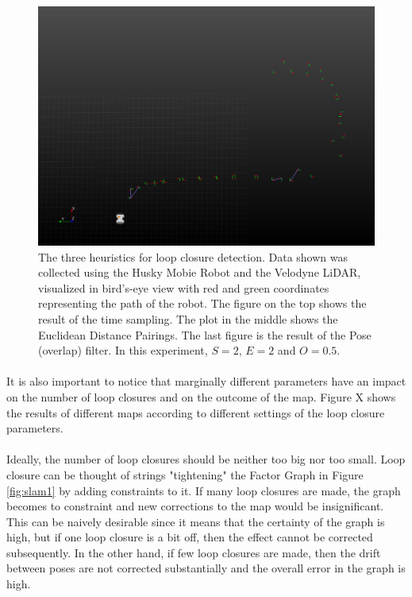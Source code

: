 \documentclass[11pt]{article}
\begin{document}
\begin{figure}
\begin{minipage}{0.67\textwidth}
				\includegraphics[width=\textwidth]{LoopClosureFinal}
	\end{minipage}\hfill
	\begin{minipage}{0.33\textwidth}
		\centering
		\caption[t]{The three heuristics for loop closure detection. Data shown was collected using the Husky Mobie Robot and the Velodyne LiDAR, visualized in bird's-eye view with red and green coordinates representing the path of the robot. The figure on the top shows the result of the time sampling. The plot in the middle shows the Euclidean Distance Pairings. The last figure is the result of the Pose (overlap) filter. In this experiment, $S=2$, $E=2$ and $O=0.5$.}
		\label{fig:loopClosureDetection}
	\end{minipage}
	\end{figure}
	\paragraph{}
	It is also important to notice that marginally different parameters have an impact on the number of loop closures and on the outcome of the map. Figure X shows the results of different maps according to different settings of the loop closure parameters.
	
	\paragraph{}
	Ideally, the number of loop closures should be neither too big nor too small. Loop closure can be thought of strings "tightening" the Factor Graph in Figure \ref{fig:slam1} by adding constraints to it. If many loop closures are made, the graph becomes to constraint and new corrections to the map would be insignificant. This can be naively desirable since it means that the certainty of the graph is high, but if one loop closure is a bit off, then the effect cannot be corrected subsequently. In the other hand, if few loop closures are made, then the drift between poses are not corrected substantially and the overall error in the graph is high.
	
\end{document}
